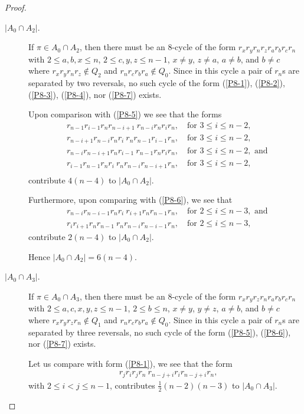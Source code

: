 \documentclass[final]{dmtcs-episciences}
\numberwithin{equation}{section}
\begin{document}
\begin{proof}
\begin{description}
\item [$|A_0 \cap A_2|$.] If $\pi \in A_0 \cap A_2$, then there must be an 8-cycle of the form $r_x r_y r_n r_z r_a r_b r_c r_n$ with $2 \leq a,b,x \leq n$, $2 \leq c,y,z \leq n-1$, $x \neq y$, $z \neq a$, $a \neq b$, and $b \neq c$ where $r_x r_y r_n r_z \notin Q_2$ and $r_n r_c r_b r_a \notin Q_0$. 
Since in this cycle a pair of $r_n$s are separated by two reversals, no such cycle of the form (\ref{P8-1}), (\ref{P8-2}), (\ref{P8-3}), (\ref{P8-4}), nor (\ref{P8-7}) exists.

Upon comparison with (\ref{P8-5}) we see that the forms
\begin{align*}
&r_{n-1}r_{i-1}r_{n}r_{n-i+1}\ r_{n-i}r_{n}r_{i}r_{n}, \quad \text{for } 3 \leq i \leq n-2,\\
&r_{n-i+1}r_{n-i}r_{n}r_{i}\ r_{n}r_{n-1}r_{i-1}r_{n}, \quad \text{for } 3 \leq i \leq n-2,\\
&r_{n-i}r_{n-i+1}r_{n}r_{i-1}\ r_{n-1}r_{n}r_{i}r_{n}, \quad \text{for } 3 \leq i \leq n-2, \text{ and }\\
&r_{i-1}r_{n-1}r_{n}r_{i}\ r_{n}r_{n-i}r_{n-i+1}r_{n}, \quad \text{for } 3 \leq i \leq n-2,\\
\end{align*}
contribute $4(n-4)$ to $|A_0 \cap A_2|$.

Furthermore, upon comparing with (\ref{P8-6}), we see that
\begin{align*}
&r_{n-i}r_{n-i-1}r_{n}r_{i}\ r_{i+1}r_{n}r_{n-1}r_{n}, \quad \text{for } 2 \leq i \leq n-3, \text{ and }\\
&r_{i}r_{i+1}r_{n}r_{n-1}\ r_{n}r_{n-i}r_{n-i-1}r_{n}, \quad \text{for } 2 \leq i \leq n-3,
\end{align*}
contribute $2(n-4)$ to $|A_0 \cap A_2|$. 

Hence $|A_0 \cap A_2| = 6(n-4)$.



\item[$|A_0 \cap A_3|$.] If $\pi\in A_0\cap A_3$, then there must be an 8-cycle of the form $r_x r_y r_z r_n r_a r_b r_c r_n$ with $2 \leq a,c,x,y,z \leq n-1$, $2 \leq b \leq n$, $x \neq y$, $y \neq z$, $a \neq b$, and $b \neq c$ where $r_x r_y r_z r_n \notin Q_1$ and $r_n r_c r_b r_a \notin Q_0$. 
Since in this cycle a pair of $r_n$s are separated by three reversals, no such cycle of the form (\ref{P8-5}), (\ref{P8-6}), nor (\ref{P8-7}) exists.

Let us compare with form (\ref{P8-1}), we see that the form
\begin{align*}
    &r_{j}r_{i}r_{j}r_{n}\ r_{n-j+i}r_{i}r_{n-j+i}r_{n},
\end{align*} 
with $2 \leq i <j \leq n-1$, contributes $\frac{1}{2}(n-2)(n-3)$ to $|A_0\cap A_3|$. 


\end{description}
\end{proof}
\end{document}
